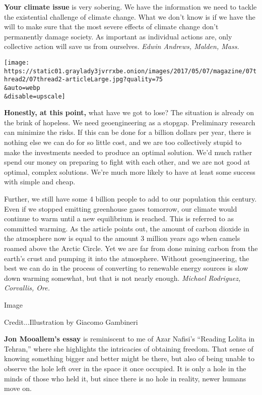 \textbf{Your climate issue} is very sobering. We have the information we
need to tackle the existential challenge of climate change. What we
don't know is if we have the will to make sure that the most severe
effects of climate change don't permanently damage society. As important
as individual actions are, only collective action will save us from
ourselves. \emph{Edwin Andrews, Malden, Mass.}

\texttt{[image: https://static01.graylady3jvrrxbe.onion/images/2017/05/07/magazine/07thread2/07thread2-articleLarge.jpg?quality=75\\\&auto=webp\\\&disable=upscale]}

\textbf{Honestly, at this point,} what have we got to lose? The
situation is already on the brink of hopeless. We need geoengineering as
a stopgap. Preliminary research can minimize the risks. If this can be
done for a billion dollars per year, there is nothing else we can do for
so little cost, and we are too collectively stupid to make the
investments needed to produce an optimal solution. We'd much rather
spend our money on preparing to fight with each other, and we are not
good at optimal, complex solutions. We're much more likely to have at
least some success with simple and cheap.

Further, we still have some 4 billion people to add to our population
this century. Even if we stopped emitting greenhouse gases tomorrow, our
climate would continue to warm until a new equilibrium is reached. This
is referred to as committed warming. As the article points out, the
amount of carbon dioxide in the atmosphere now is equal to the amount 3
million years ago when camels roamed above the Arctic Circle. Yet we are
far from done mining carbon from the earth's crust and pumping it into
the atmosphere. Without geoengineering, the best we can do in the
process of converting to renewable energy sources is slow down warming
somewhat, but that is not nearly enough. \emph{Michael Rodriguez,
Corvallis, Ore.}

Image

Credit...Illustration by Giacomo Gambineri

\textbf{Jon Mooallem's essay} is reminiscent to me of Azar Nafisi's
``Reading Lolita in Tehran,'' where she highlights the intricacies of
obtaining freedom. That sense of knowing something bigger and better
might be there, but also of being unable to observe the hole left over
in the space it once occupied. It is only a hole in the minds of those
who held it, but since there is no hole in reality, newer humans move
on.

